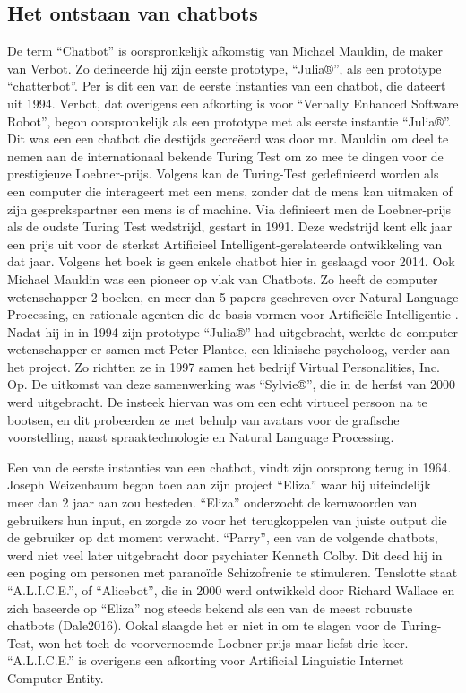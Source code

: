 \subsection{Het ontstaan van chatbots}
De term “Chatbot” is oorspronkelijk afkomstig van Michael Mauldin, de maker van Verbot. Zo defineerde hij zijn eerste prototype, “Julia®”, als een prototype “chatterbot”. Per \textcite{Vlahos2019} is dit een van de eerste instanties van een chatbot, die dateert uit 1994. Verbot, dat overigens een afkorting is voor “Verbally Enhanced Software Robot”, begon oorspronkelijk als een prototype met als eerste instantie “Julia®”. Dit was een een chatbot die destijds gecreëerd was door mr. Mauldin om deel te nemen aan de internationaal bekende Turing Test om zo mee te dingen voor de prestigieuze Loebner-prijs. Volgens \textcite{Moor2012} kan de Turing-Test gedefinieerd worden als een computer die interageert met een mens, zonder dat de mens kan uitmaken of zijn gesprekspartner een mens is of machine. Via \textcite{O'Neill2016} definieert men de Loebner-prijs als de oudste Turing Test wedstrijd, gestart in 1991. Deze wedstrijd kent elk jaar een prijs uit voor de sterkst Artificieel Intelligent-gerelateerde ontwikkeling van dat jaar. Volgens het boek is geen enkele chatbot hier in geslaagd voor 2014. 
Ook Michael Mauldin was een pioneer op vlak van Chatbots. Zo heeft de computer wetenschapper 2 boeken, en meer dan 5 papers geschreven over Natural Language Processing, en rationale agenten die de basis vormen voor Artificiële Intelligentie \textcite{Vlahos2019}. Nadat hij in in 1994 zijn prototype “Julia®” had uitgebracht, werkte de computer wetenschapper er samen met Peter Plantec, een klinische psycholoog, verder aan het project. Zo richtten ze in 1997 samen het bedrijf Virtual Personalities, Inc. Op. De uitkomst van deze samenwerking was “Sylvie®”, die in de herfst van 2000 werd uitgebracht. De insteek hiervan was om een echt virtueel persoon na te bootsen, en dit probeerden ze met behulp van avatars voor de grafische voorstelling, naast spraaktechnologie en Natural Language Processing.


Een van de eerste instanties van een chatbot, vindt zijn oorsprong terug in 1964. Joseph Weizenbaum \autocite{Weizenbaum1966} begon toen aan zijn project “Eliza” waar hij uiteindelijk meer dan 2 jaar aan zou besteden. “Eliza” onderzocht de kernwoorden van gebruikers hun input, en zorgde zo voor het terugkoppelen van juiste output die de gebruiker op dat moment verwacht. 
“Parry”, een van de volgende chatbots, werd niet veel later uitgebracht door psychiater Kenneth Colby. Dit deed hij in een poging om personen met paranoïde Schizofrenie te stimuleren. 
Tenslotte staat “A.L.I.C.E.”, of “Alicebot”, die in 2000 werd ontwikkeld door Richard Wallace en zich baseerde op “Eliza” nog steeds bekend als een van de meest robuuste chatbots (Dale2016). Ookal slaagde het er niet in om te slagen voor de Turing-Test, won het toch de voorvernoemde Loebner-prijs maar liefst drie keer. “A.L.I.C.E.” is overigens een afkorting voor Artificial Linguistic Internet Computer Entity. 


